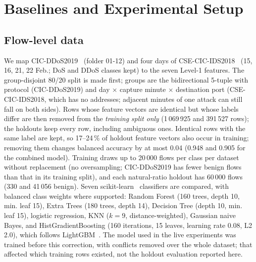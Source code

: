 \documentclass[conference]{IEEEtran}
\begin{document}
\section{Baselines and Experimental Setup}\label{sec:setup}
\subsection{Flow-level data}
We map CIC-DDoS2019~\cite{sharafaldin2019ddos} (folder 01-12) and four days of CSE-CIC-IDS2018~\cite{sharafaldin2018toward} (15, 16, 21, 22 Feb.; DoS and DDoS classes kept) to the seven Level-1 features. The group-disjoint 80/20 split is made first; groups are the bidirectional 5-tuple with protocol (CIC-DDoS2019) and day $\times$ capture minute $\times$ destination port (CSE-CIC-IDS2018, which has no addresses; adjacent minutes of one attack can still fall on both sides). Rows whose feature vectors are identical but whose labels differ are then removed from the \emph{training split only} (1\,069\,925 and 391\,527 rows); the holdouts keep every row, including ambiguous ones. Identical rows with the same label are kept, so 17--24\,\% of holdout feature vectors also occur in training; removing them changes balanced accuracy by at most 0.04 (0.948 and 0.905 for the combined model). Training draws up to 20\,000 flows per class per dataset without replacement (no oversampling; CIC-DDoS2019 has fewer benign flows than that in its training split), and each natural-ratio holdout has 60\,000 flows (330 and 41\,056 benign). Seven scikit-learn~\cite{pedregosa2011scikit} classifiers are compared, with balanced class weights where supported: Random Forest (160 trees, depth 10, min. leaf 15), Extra Trees (180 trees, depth 14), Decision Tree (depth 10, min. leaf 15), logistic regression, KNN ($k=9$, distance-weighted), Gaussian naive Bayes, and HistGradientBoosting (160 iterations, 15 leaves, learning rate 0.08, L2 2.0), which follows LightGBM~\cite{ke2017lightgbm}. The model used in the live experiments was trained before this correction, with conflicts removed over the whole dataset; that affected which training rows existed, not the holdout evaluation reported here.
\end{document}
